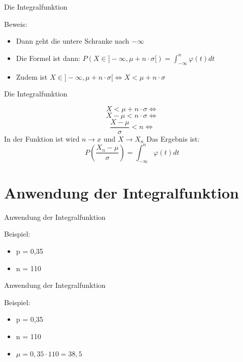 \documentclass[14pt]{beamer}
\begin{document}
\begin{frame} {Die Integralfunktion}

Beweis:

 \begin{itemize}
  \item Dann geht die untere Schranke nach $ - \infty $
  \item Die Formel ist dann: $ P(X \in ] -\infty, \mu + n \cdot \sigma[) = \int_{-\infty}^n\varphi(t)dt $
  \item Zudem ist $ X \in ]-\infty, \mu + n \cdot \sigma[ \Leftrightarrow X < \mu + n \cdot \sigma $
 \end{itemize}

\end{frame}

\begin{frame} {Die Integralfunktion}

 $$ X < \mu + n \cdot \sigma \Leftrightarrow $$ $$ X - \mu < n \cdot \sigma \Leftrightarrow $$ $$ \frac{X - \mu}{\sigma} < n \Leftrightarrow $$
 In der Funktion ist wird $ n \rightarrow x $ und $ X \rightarrow X_n $
 Das Ergebnis ist:
 $$ P\left(\frac{X_n - \mu}{\sigma}\right) = \int_{-\infty}^n\varphi(t)dt  $$

\end{frame}

\section{Anwendung der Integralfunktion}
\begin{frame} {Anwendung der Integralfunktion}

Beispiel:
\begin{itemize}
 \item p = 0,35
 \item n = 110
\end{itemize}

\end{frame}

\begin{frame} {Anwendung der Integralfunktion}

Beispiel:
\begin{itemize}
 \item p = 0,35
 \item n = 110
 \item $\mu = 0,35 \cdot 110 = 38,5 $
\end{itemize}

\end{frame}
\end{document}
